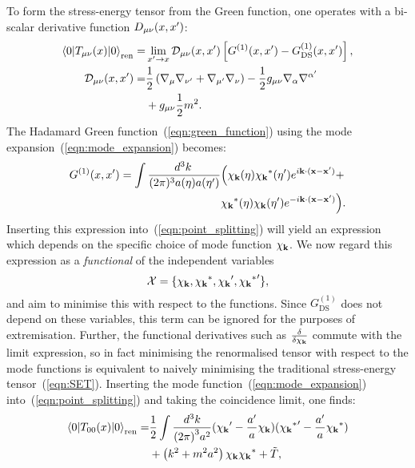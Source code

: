 To form the stress-energy tensor from the Green function, one operates with a bi-scalar derivative function $D_{\mu\nu}(x,{{x}^\prime})$:
\begin{align}
  \left\langle0\middle|T_{\mu\nu}(x)\middle|0\right\rangle_\mathrm{ren} =& \lim\limits_{{{x}^\prime}\to x} \mathcal{D}_{\mu\nu}(x,{{x}^\prime}) \left[ G^{(1)}(x,{{x}^\prime}) - G^{(1)}_\mathrm{DS}(x,{{x}^\prime}) \right],
  \label{eqn:point_splitting}
  \\
  \mathcal{D}_{\mu\nu}(x,{{x}^\prime})=& \frac{1}{2}\left( \nabla_{\mu}\nabla_{{{\nu}^\prime}} + \nabla_{{{\mu}^\prime}}\nabla_{\nu} \right) -\frac{1}{2} g_{\mu\nu} \nabla_\alpha \nabla^{{{\alpha}^\prime}} \nonumber\\
  &+ g_{\mu\nu} \frac{1}{2}m^2.  \nonumber
\end{align}
The Hadamard Green function~(\ref{eqn:green_function}) using the mode expansion~(\ref{eqn:mode_expansion}) becomes:
\begin{align}
  G^{(1)}(x,{{x}^\prime}) = 
  \int\frac{d^3 k\:}{(2\pi)^3a(\eta)a({{\eta}^\prime})}&
  \Big(
  \chi_{\mathbf{k}}(\eta)
  {\chi_{\mathbf{k}}}^\ast({{\eta}^\prime})e^{i\mathbf{k}\cdot(\mathbf{x}-{{\mathbf{x}}^\prime})}+\nonumber\\
  &
  {\chi_{\mathbf{k}}}^\ast(\eta)
  \chi_{\mathbf{k}}({{\eta}^\prime})e^{-i\mathbf{k}\cdot(\mathbf{x}-{{\mathbf{x}}^\prime})}
  \Big).
  \nonumber
\end{align}
Inserting this expression into~(\ref{eqn:point_splitting}) will yield an expression which depends on the specific choice of mode function $\chi_{\mathbf{k}}$. We now regard this expression as a {\em functional\/} of the independent variables 
\begin{equation}
  \mathcal{X} = \{\chi_{\mathbf{k}},{\chi_{\mathbf{k}}}^\ast,{{\chi_{\mathbf{k}}}^\prime},{{{\chi_{\mathbf{k}}}^\ast}^\prime}\},
  \label{eqn:vars}
\end{equation}
and aim to minimise this with respect to the functions. Since $G^{(1)}_{\mathrm{DS}}$ does not depend on these variables, this term can be ignored for the purposes of extremisation. Further, the functional derivatives such as $\frac{\delta}{\delta \chi_{\mathbf{k}}}$ commute with the limit expression, so in fact minimising the renormalised tensor with respect to the mode functions is equivalent to naively minimising the traditional stress-energy tensor~(\ref{eqn:SET}). Inserting the mode function~(\ref{eqn:mode_expansion}) into~(\ref{eqn:point_splitting}) and taking the coincidence limit, one finds:
\begin{align}
  \left\langle0\middle|T_{00}(x)\middle|0\right\rangle_\mathrm{ren} = &\frac{1}{2}\int \frac{d^3 k}{{(2\pi)}^3 a^2} ({{\chi_{\mathbf{k}}}^\prime}-\frac{{{a}^\prime}}{a}\chi_{\mathbf{k}})({{{\chi_{\mathbf{k}}}^\ast}^\prime}-\frac{{{a}^\prime}}{a}{\chi_{\mathbf{k}}}^\ast)
  \nonumber \\
  &+\left( k^2 + m^2a^2 \right)\chi_{\mathbf{k}} {\chi_{\mathbf{k}}}^\ast + \tilde{T},
\end{align}
